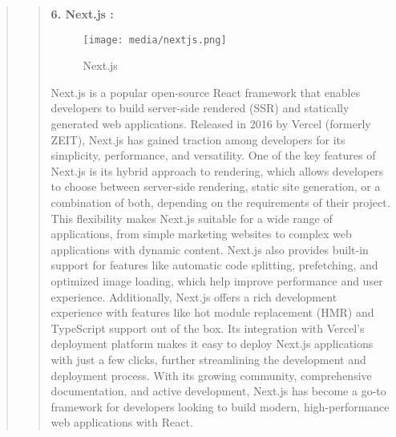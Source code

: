 \documentclass[12pt]{report}
\begin{document}
\begin{quote}
		\begin{quote}
			\textbf{6. Next.js :}\\
			\begin{figure}
				\centering
				\texttt{[image: media/nextjs.png]}\\
				\caption{Next.js}
			\end{figure}
			Next.js is a popular open-source React framework that enables developers to build server-side rendered (SSR) and statically generated web applications. Released in 2016 by Vercel (formerly ZEIT), Next.js has gained traction among developers for its simplicity, performance, and versatility. One of the key features of Next.js is its hybrid approach to rendering, which allows developers to choose between server-side rendering, static site generation, or a combination of both, depending on the requirements of their project. This flexibility makes Next.js suitable for a wide range of applications, from simple marketing websites to complex web applications with dynamic content. Next.js also provides built-in support for features like automatic code splitting, prefetching, and optimized image loading, which help improve performance and user experience. Additionally, Next.js offers a rich development experience with features like hot module replacement (HMR) and TypeScript support out of the box. Its integration with Vercel's deployment platform makes it easy to deploy Next.js applications with just a few clicks, further streamlining the development and deployment process. With its growing community, comprehensive documentation, and active development, Next.js has become a go-to framework for developers looking to build modern, high-performance web applications with React.
		\end{quote}
		\clearpage
		

\end{quote}
\end{document}
